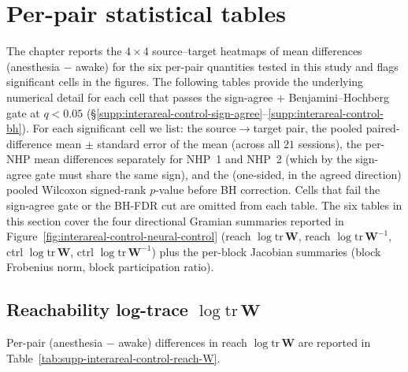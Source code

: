\section{Per-pair statistical tables}\label{supp:interareal-control-tables}

The chapter reports the $4\!\times\!4$ source--target heatmaps of mean differences (anesthesia $-$ awake) for the six per-pair quantities tested in this study and flags significant cells in the figures. The following tables provide the underlying numerical detail for each cell that passes the sign-agree + Benjamini--Hochberg gate at $q<0.05$ (\S\ref{supp:interareal-control-sign-agree}--\ref{supp:interareal-control-bh}). For each significant cell we list: the source$\to$target pair, the pooled paired-difference mean $\pm$ standard error of the mean (across all $21$ sessions), the per-NHP mean differences separately for NHP~1 and NHP~2 (which by the sign-agree gate must share the same sign), and the (one-sided, in the agreed direction) pooled Wilcoxon signed-rank $p$-value before BH correction. Cells that fail the sign-agree gate or the BH-FDR cut are omitted from each table. The six tables in this section cover the four directional Gramian summaries reported in Figure~\ref{fig:interareal-control-neural-control} (reach $\log\mathrm{tr}\,\mathbf{W}$, reach $\log\mathrm{tr}\,\mathbf{W}^{-1}$, ctrl $\log\mathrm{tr}\,\mathbf{W}$, ctrl $\log\mathrm{tr}\,\mathbf{W}^{-1}$) plus the per-block Jacobian summaries (block Frobenius norm, block participation ratio).

\subsection*{Reachability log-trace $\log\mathrm{tr}\,\mathbf{W}$}\label{supp:interareal-control-tab-reach-W}

Per-pair (anesthesia $-$ awake) differences in reach $\log\mathrm{tr}\,\mathbf{W}$ are reported in Table~\ref{tab:supp-interareal-control-reach-W}.

